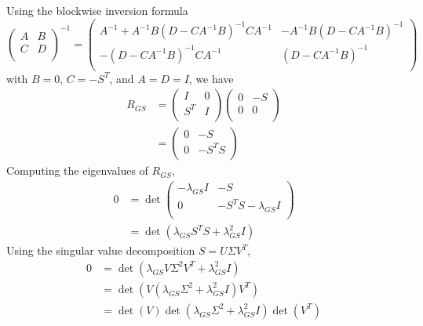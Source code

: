 \documentclass[11pt]{article} %
\begin{document}
Using the blockwise inversion formula
\begin{equation}
\left ( \begin{array}{rr}
A & B \\
C & D \\
\end{array} \right ) ^{-1}= 
\left ( \begin{array}{rr}
A^{-1}+A^{-1}B(D-CA^{-1}B)^{-1}CA^{-1} & -A^{-1}B(D-CA^{-1}B)^{-1} \\
-(D-CA^{-1}B)^{-1}CA^{-1}&(D-CA ^{-1}B)^{-1}\\
\end{array} \right ) 
\end{equation}
with $B=0$, $C=-S^T$, and $A=D=I$, we have
\begin{equation}
\begin{split}
R_{GS} &=\left ( \begin{array}{rr}
I  & 0 \\
S^T & I \\
\end{array} \right ) 
\left ( \begin{array}{rr}
0 & -S \\
0 & 0 \\
\end{array} \right ) \\
& = \left ( \begin{array}{rr}
0 & -S \\
0 & -S^T S \\
\end{array} \right )
\end{split}
\end{equation}
Computing the eigenvalues of $R_{GS}$,
\begin{equation}
\begin{split}
0&=\det\left ( \begin{array}{rr}
-\lambda_{GS}I & -S \\
0 & -S^T S- \lambda_{GS} I \\
\end{array} \right ) \\
& =\det \left ( \lambda_{GS} S^T S +  \lambda_{GS}^2 I  \right )
\end{split}
\end{equation}
Using the singular value decomposition $S = U \Sigma V^T$,
\begin{equation}
\begin{split}
0&= \det \left( \lambda_{GS} V \Sigma^2 V^T + \lambda_{GS}^2 I \right ) \\
& = \det \left ( V \left ( \lambda_{GS} \Sigma^2 + \lambda_{GS}^2 I \right ) V^T \right ) \\
& = \det (V) \det \left ( \lambda_{GS} \Sigma^2 + \lambda_{GS}^2 I \right ) \det(V^T)
\end{split}
\end{equation}
\end{document}

